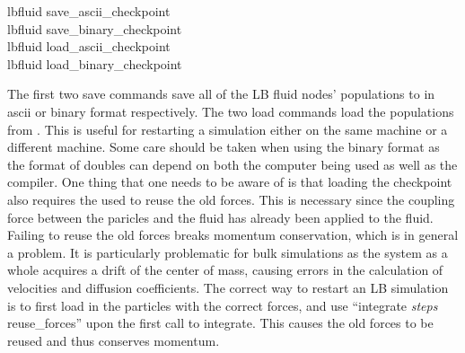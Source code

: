 \begin{essyntax}
  lbfluid save_ascii_checkpoint \\
  lbfluid save_binary_checkpoint \\
  lbfluid load_ascii_checkpoint \\
  lbfluid load_binary_checkpoint 
\end{essyntax}
The first two save commands save all of the LB fluid nodes' populations to  in ascii or binary format respectively.
The two load commands load the populations from .  This is  useful for restarting a simulation either on the same
machine or a different machine.  Some care should be taken when using the binary format as the format of doubles can depend
on both the computer being used as well as the compiler. One thing that one needs to be aware of is that loading the checkpoint also requires the used to reuse the old forces. This is necessary
since the coupling force between the paricles and the fluid has already been applied to the fluid. Failing to reuse the old forces breaks momentum conservation, which is in general a problem. It is
particularly problematic for bulk simulations as the system as a whole acquires a drift of the center of mass, causing errors in the calculation of velocities and diffusion coefficients.
The correct way to restart
an LB simulation is to first load in the particles with the correct forces, and use ``integrate {\it steps} reuse_forces'' upon the first
call to integrate. This causes the old forces to be reused and thus conserves momentum.


